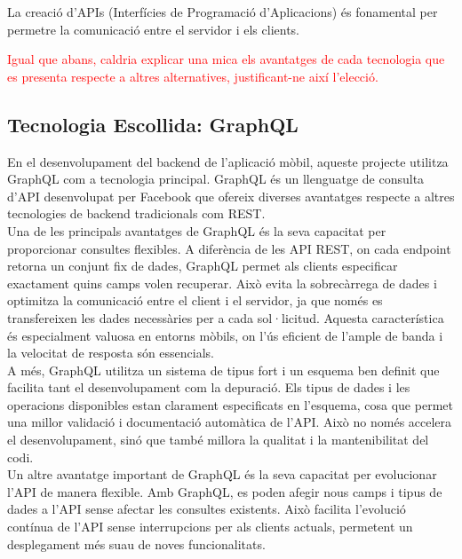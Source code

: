\documentclass[a4paper,12pt,twoside]{ThesisStyle}
\newcommand{\pau}[1]{\textcolor{red}{#1}}
\begin{document}
La creació d'APIs (Interfícies de Programació d'Aplicacions) és fonamental per permetre la comunicació entre el servidor i els clients.

\pau{Igual que abans, caldria explicar una mica els avantatges de cada tecnologia que es presenta respecte a altres alternatives, justificant-ne així l'elecció.}


\subsection{Tecnologia Escollida: GraphQL}
\label{subsec: Tecnologies Escollida: GraphQL}

En el desenvolupament del backend de l'aplicació mòbil, aqueste projecte utilitza GraphQL com a tecnologia principal. GraphQL és un llenguatge de consulta d'API desenvolupat per Facebook que ofereix diverses avantatges respecte a altres tecnologies de backend tradicionals com REST.\\

Una de les principals avantatges de GraphQL és la seva capacitat per proporcionar consultes flexibles. A diferència de les API REST, on cada endpoint retorna un conjunt fix de dades, GraphQL permet als clients especificar exactament quins camps volen recuperar. Això evita la sobrecàrrega de dades i optimitza la comunicació entre el client i el servidor, ja que només es transfereixen les dades necessàries per a cada sol·licitud. Aquesta característica és especialment valuosa en entorns mòbils, on l'ús eficient de l'ample de banda i la velocitat de resposta són essencials.\\

A més, GraphQL utilitza un sistema de tipus fort i un esquema ben definit que facilita tant el desenvolupament com la depuració. Els tipus de dades i les operacions disponibles estan clarament especificats en l’esquema, cosa que permet una millor validació i documentació automàtica de l'API. Això no només accelera el desenvolupament, sinó que també millora la qualitat i la mantenibilitat del codi.\\

Un altre avantatge important de GraphQL és la seva capacitat per evolucionar l'API de manera flexible. Amb GraphQL, es poden afegir nous camps i tipus de dades a l'API sense afectar les consultes existents. Això facilita l'evolució contínua de l'API sense interrupcions per als clients actuals, permetent un desplegament més suau de noves funcionalitats.\\
\end{document}
